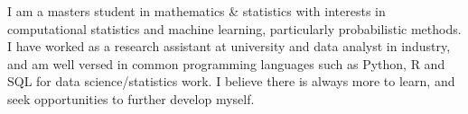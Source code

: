 


\begin{cvparagraph}

I am a masters student in mathematics \& statistics with interests in computational statistics and machine learning, particularly probabilistic methods.
I have worked as a research assistant at university and data analyst in industry, and am well versed in common programming languages such as Python, R and SQL for data science/statistics work. I believe there is always more to learn, and seek opportunities to further develop myself.
\end{cvparagraph}
